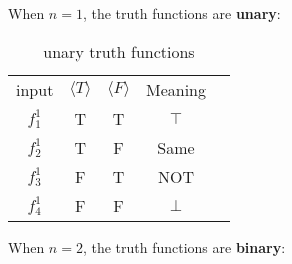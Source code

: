 \documentclass[12pt, letterpaper]{article}
\begin{document}
When $n = 1$, the truth functions are \textbf{unary}:

\begin{table}[H]
  \centering
  \begin{tabular}{|c|c|c|c|c}
  \cline{1-4}
  input   & $\langle T \rangle$ & $\langle F \rangle$ & Meaning &  \\ [1ex] \cline{1-4}
  $f_1^1$ & T                   & T                   & $\top$  &  \\ [0.5ex] \cline{1-4}
  $f_2^1$ & T                   & F                   & Same    &  \\ [0.5ex] \cline{1-4}
  $f_3^1$ & F                   & T                   & NOT     &  \\ [0.5ex] \cline{1-4}
  $f_4^1$ & F                   & F                   & $\bot$  &  \\ [0.5ex] \cline{1-4}
  \end{tabular}
  \caption{unary truth functions}
\end{table}

When $n = 2$, the truth functions are \textbf{binary}:
\end{document}
